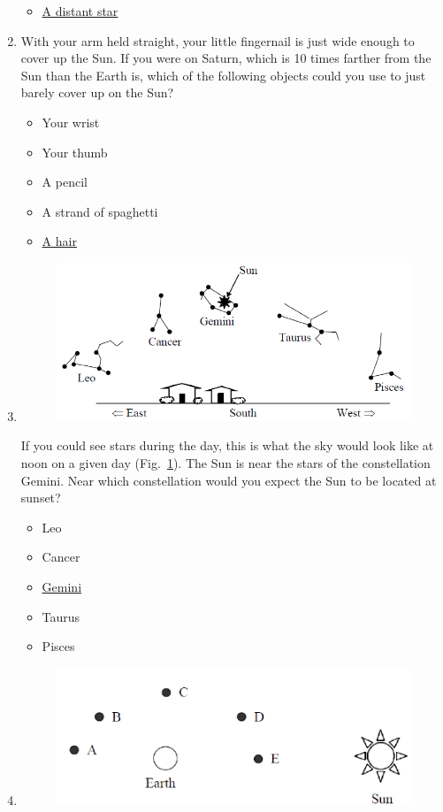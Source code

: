 \documentclass[12pt]{article}
\begin{document}
\begin{enumerate}
\begin{itemize}
    \item \underline{A distant star}
\end{itemize}
\item%
With your arm held straight, your little fingernail is just wide enough to cover up the Sun. If you were on Saturn, which is 10 times farther from the Sun than the Earth is, which of the following objects could you use to just barely cover up on the Sun?
\begin{itemize}
    \item Your wrist
    \item Your thumb
    \item A pencil
    \item A strand of spaghetti
    \item \underline{A hair}
\end{itemize}
\item
\begin{figure}[htbp]
    \centering
    \includegraphics{asq8.png}
    \caption{}
    \label{fig:asq8}
\end{figure}
If you could see stars during the day, this is what the sky would look like at noon on a given day (Fig.~\ref{fig:asq8}). The Sun is near the stars of the constellation Gemini. Near which constellation would you expect the Sun to be located at sunset?
\begin{itemize}
    \item Leo
    \item Cancer
    \item \underline{Gemini}
    \item Taurus
    \item Pisces
\end{itemize}
\item
\begin{figure}[htbp]
    \centering
    \includegraphics{asq9a.png}

\end{figure}
\end{enumerate}
\end{document}
